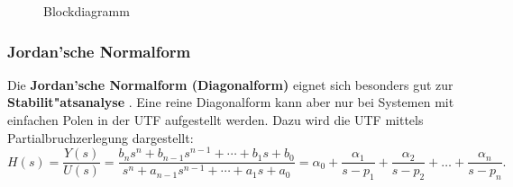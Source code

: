 \begin{figure}[!htb]
  \vspace*{-4mm}\begin{center}
    \caption{Blockdiagramm} \vspace*{-3mm}
\end{center}
\vspace*{-6mm}
\end{figure}

\subsubsection{Jordan'sche Normalform}
Die {\bf Jordan'sche Normalform (Diagonalform)} eignet sich besonders gut zur {\bf Stabilit"atsanalyse} \cite{UNB:89}. Eine reine Diagonalform kann aber nur bei Systemen mit einfachen Polen in der UTF aufgestellt werden. Dazu wird die UTF mittels 
Partialbruchzerlegung dargestellt:\\
\begin{equation*}
H(s)=\frac{Y(s)}{U(s)}=\frac{b_{n} s^{n} + b_{n-1} s^{n-1} +\cdots+b_{1} s + b_{0}}{s^{n} + a_{n-1} s^{n-1} + \cdots + a_{1} s + a_{0}}= \alpha_0 + \frac{\alpha_1}{s-p_1}+ \frac{\alpha_2}{s-p_2}+\ldots  + \frac{\alpha_n}{s-p_n} .
\end{equation*}



